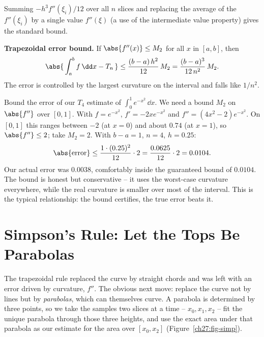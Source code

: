 Summing $-h^3 f''(\xi_i)/12$ over all $n$ slices and replacing the average of the $f''(\xi_i)$ by a single value $f''(\xi)$ (a use of the intermediate value property) gives the standard bound.

\begin{focusbox}
\textbf{Trapezoidal error bound.} If $\abs{f''(x)} \le M_2$ for all $x$ in $[a,b]$, then
\[
\abs{\,\int_a^b f\,\dd x - T_n\,} \le \frac{(b-a)\,h^2}{12}\,M_2 = \frac{(b-a)^3}{12\,n^2}\,M_2.
\]
The error is controlled by the largest curvature on the interval and falls like $1/n^2$.
\end{focusbox}

\begin{labbox}
Bound the error of our $T_4$ estimate of $\int_0^1 e^{-x^2}\,\dd x$. We need a bound $M_2$ on $\abs{f''}$ over $[0,1]$. With $f = e^{-x^2}$, $f' = -2x e^{-x^2}$ and $f'' = (4x^2 - 2)e^{-x^2}$. On $[0,1]$ this ranges between $-2$ (at $x=0$) and about $0.74$ (at $x=1$), so $\abs{f''} \le 2$; take $M_2 = 2$. With $b-a = 1$, $n=4$, $h = 0.25$:
\[
\abs{\text{error}} \le \frac{1 \cdot (0.25)^2}{12}\cdot 2 = \frac{0.0625}{12}\cdot 2 = 0.0104.
\]
Our actual error was $0.0038$, comfortably inside the guaranteed bound of $0.0104$. The bound is honest but conservative -- it uses the worst-case curvature everywhere, while the real curvature is smaller over most of the interval. This is the typical relationship: the bound certifies, the true error beats it.
\end{labbox}

\section{Simpson's Rule: Let the Tops Be Parabolas}
\label{ch27:simpson}

The trapezoidal rule replaced the curve by straight chords and was left with an error driven by curvature, $f''$. The obvious next move: replace the curve not by lines but by \emph{parabolas}, which can themselves curve. A parabola is determined by three points, so we take the samples two slices at a time -- $x_0, x_1, x_2$ -- fit the unique parabola through those three heights, and use the exact area under that parabola as our estimate for the area over $[x_0, x_2]$ (Figure~\ref{ch27:fig-simp}).

